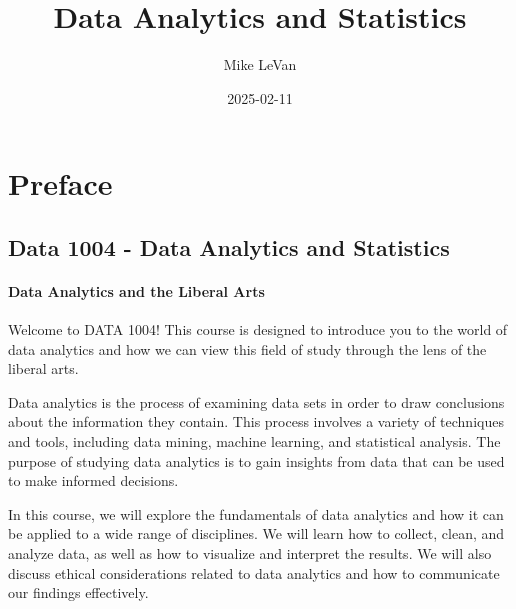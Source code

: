 \documentclass[
  letterpaper,
  DIV=11,
  numbers=noendperiod]{scrreprt}
\title{Data Analytics and Statistics}
\author{Mike LeVan}
\date{2025-02-11}
\renewcommand*\contentsname{Table of contents}
\newcommand\contentsname{Table of contents}
\begin{document}
\maketitle

\renewcommand*\contentsname{Table of contents}
{
\hypersetup{linkcolor=}
\setcounter{tocdepth}{2}
\tableofcontents
}


\chapter*{Preface}\label{preface}


\section*{Data 1004 - Data Analytics and
Statistics}\label{data-1004---data-analytics-and-statistics}


\subsubsection*{Data Analytics and the Liberal
Arts}\label{data-analytics-and-the-liberal-arts}

Welcome to DATA 1004! This course is designed to introduce you to the
world of data analytics and how we can view this field of study through
the lens of the liberal arts.

Data analytics is the process of examining data sets in order to draw
conclusions about the information they contain. This process involves a
variety of techniques and tools, including data mining, machine
learning, and statistical analysis. The purpose of studying data
analytics is to gain insights from data that can be used to make
informed decisions.

In this course, we will explore the fundamentals of data analytics and
how it can be applied to a wide range of disciplines. We will learn how
to collect, clean, and analyze data, as well as how to visualize and
interpret the results. We will also discuss ethical considerations
related to data analytics and how to communicate our findings
effectively.
\end{document}
